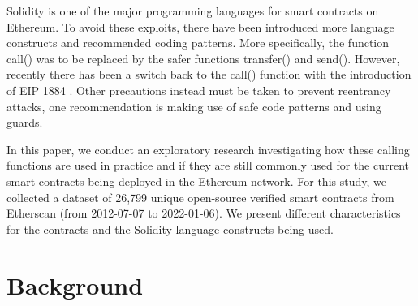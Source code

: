 \documentclass[10pt,conference]{IEEEtran}
\newcommand{\totalContracts}{26,799\xspace}
\begin{document}
Solidity is one of the major programming languages for smart contracts on Ethereum. To avoid these exploits, there have been introduced more language constructs and recommended coding patterns. More specifically, the function call() was to be replaced by the safer functions transfer() and send(). However, recently there has been a switch back to the call() function with the introduction of EIP 1884 \cite{eip1884}. Other precautions instead must be taken to prevent reentrancy attacks, one recommendation is making use of safe code patterns and using guards.

In this paper, we conduct an exploratory research investigating how these calling functions are used in practice and if they are still commonly used for the current smart contracts being deployed in the Ethereum network. For this study, we collected a dataset of \totalContracts unique open-source verified smart contracts from Etherscan (from 2012-07-07 to 2022-01-06). We present different characteristics for the contracts and the Solidity language constructs being used.


\section{Background}


\end{document}
